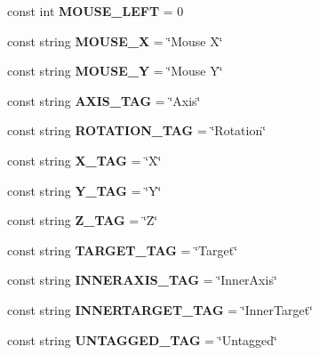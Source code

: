 \begin{DoxyCompactItemize}
const int {\bfseries M\+O\+U\+S\+E\+\_\+\+L\+E\+FT} = 0
\item 
\mbox{\label{class_selection_control_a14444540f17d4b87fe35f8e86d4cb8f2}} 
const string {\bfseries M\+O\+U\+S\+E\+\_\+X} = \char`\"{}Mouse X\char`\"{}
\item 
\mbox{\label{class_selection_control_ae95a0486603473b13bb8574243b5f8a1}} 
const string {\bfseries M\+O\+U\+S\+E\+\_\+Y} = \char`\"{}Mouse Y\char`\"{}
\item 
\mbox{\label{class_selection_control_aeec127e2100508c425fbb65214ad2723}} 
const string {\bfseries A\+X\+I\+S\+\_\+\+T\+AG} = \char`\"{}Axis\char`\"{}
\item 
\mbox{\label{class_selection_control_aa3bc3c7802776bdf966b3c84ec3594c6}} 
const string {\bfseries R\+O\+T\+A\+T\+I\+O\+N\+\_\+\+T\+AG} = \char`\"{}Rotation\char`\"{}
\item 
\mbox{\label{class_selection_control_a9f6de25cb6566ac2085cf19d0ce44c35}} 
const string {\bfseries X\+\_\+\+T\+AG} = \char`\"{}X\char`\"{}
\item 
\mbox{\label{class_selection_control_a1182ccf64b849f5484621bd2e0b540d6}} 
const string {\bfseries Y\+\_\+\+T\+AG} = \char`\"{}Y\char`\"{}
\item 
\mbox{\label{class_selection_control_aec0eac83b17afbd7fb1a430eac5fdd4e}} 
const string {\bfseries Z\+\_\+\+T\+AG} = \char`\"{}Z\char`\"{}
\item 
\mbox{\label{class_selection_control_a5371a09abf89f536bbc2ceeababda6ee}} 
const string {\bfseries T\+A\+R\+G\+E\+T\+\_\+\+T\+AG} = \char`\"{}Target\char`\"{}
\item 
\mbox{\label{class_selection_control_aea51d2511ec20b79842fe82922ef9652}} 
const string {\bfseries I\+N\+N\+E\+R\+A\+X\+I\+S\+\_\+\+T\+AG} = \char`\"{}Inner\+Axis\char`\"{}
\item 
\mbox{\label{class_selection_control_abc54b661331a4e114367de3ac2821ca5}} 
const string {\bfseries I\+N\+N\+E\+R\+T\+A\+R\+G\+E\+T\+\_\+\+T\+AG} = \char`\"{}Inner\+Target\char`\"{}
\item 
\mbox{\label{class_selection_control_adc983bc4fe003204d01a105ef7864f28}} 
const string {\bfseries U\+N\+T\+A\+G\+G\+E\+D\+\_\+\+T\+AG} = \char`\"{}Untagged\char`\"{}
\end{DoxyCompactItemize}


